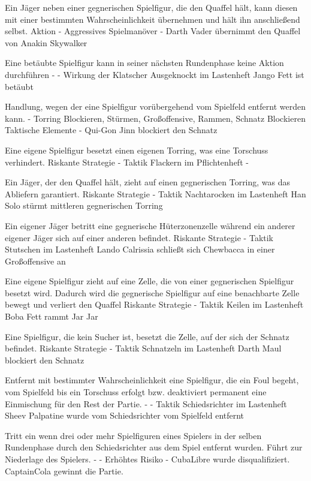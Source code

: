 {Ein Jäger neben einer gegnerischen Spielfigur, die den Quaffel hält, kann diesen mit einer bestimmten Wahrscheinlichkeit übernehmen und hält ihn anschließend selbst.}
{Aktion}
{-}
{Aggressives Spielmanöver}
{-}
{Darth Vader übernimmt den Quaffel von Anakin Skywalker}

{Eine betäubte Spielfigur kann in seiner nächsten Rundenphase keine Aktion durchführen}
{-}
{-}
{Wirkung der Klatscher}
{\glqq{}Ausgeknockt\grqq{}  im Lastenheft}
{Jango Fett ist betäubt}

{Handlung, wegen der eine Spielfigur vorübergehend vom Spielfeld entfernt werden kann.}
{-}
{Torring Blockieren, Stürmen, Großoffensive, Rammen, Schnatz Blockieren}
{Taktische Elemente}
{-}
{Qui-Gon Jinn blockiert den Schnatz}

{Eine eigene Spielfigur besetzt einen eigenen Torring, was eine Torschuss verhindert.}
{Riskante Strategie}
{-}
{Taktik}
{\glqq{}Flackern\grqq{}  im Pflichtenheft}
{-}

{Ein Jäger, der den Quaffel hält, zieht auf einen gegnerischen Torring, was das Abliefern garantiert.}
{Riskante Strategie}
{-}
{Taktik}
{\glqq{}Nachtarocken\grqq{}  im Lastenheft}
{Han Solo stürmt mittleren gegnerischen Torring}

{Ein eigener Jäger betritt eine gegnerische Hüterzonenzelle während ein anderer eigener Jäger sich auf einer anderen befindet.}
{Riskante Strategie}
{-}
{Taktik}
{\glqq{}Stutschen\grqq{}  im Lastenheft}
{Lando Calrissia schließt sich Chewbacca in einer Großoffensive an}

{Eine eigene Spielfigur zieht auf eine Zelle, die von einer gegnerischen Spielfigur besetzt wird. Dadurch wird die gegnerische Spielfigur auf eine benachbarte Zelle bewegt und verliert den Quaffel}
{Riskante Strategie}
{-}
{Taktik}
{\glqq{}Keilen\grqq{}  im Lastenheft}
{Boba Fett rammt Jar Jar}

{Eine Spielfigur, die kein Sucher ist, besetzt die Zelle, auf der sich der Schnatz befindet.}
{Riskante Strategie}
{-}
{Taktik}
{\glqq{}Schnatzeln\grqq{}  im Lastenheft}
{Darth Maul blockiert den Schnatz}

{Entfernt mit bestimmter Wahrscheinlichkeit eine Spielfigur, die ein Foul begeht, vom Spielfeld bis ein Torschuss erfolgt bzw. deaktiviert permanent eine Einmischung für den Rest der Partie.}
{-}
{-}
{Taktik}
{\glqq{}Schiedsrichter\grqq{}  im Lastenheft}
{Sheev Palpatine wurde vom Schiedsrichter vom Spielfeld entfernt}

{Tritt ein wenn drei oder mehr Spielfiguren eines Spielers in der selben Rundenphase durch den Schiedsrichter aus dem Spiel entfernt wurden. Führt zur Niederlage des Spielers.}
{-}
{-}
{Erhöhtes Risiko}
{-}
{CubaLibre wurde disqualifiziert. CaptainCola gewinnt die Partie.}
